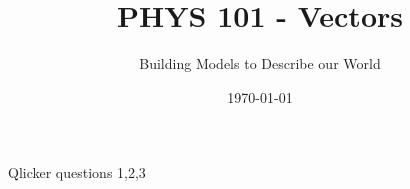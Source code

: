 \documentclass[aspectratio=169,
hyperref={colorlinks,urlcolor=blue}
]{beamer}
\begin{document}
\title{PHYS 101 - Vectors}
\institute{}
\author{Building Models to Describe our World}
\date{\today}


\begin{frame}
\titlepage
\thispagestyle{empty}
\end{frame}


%

\begin{frame}{Qlicker questions 1,2,3}

\end{frame}



\end{document}
